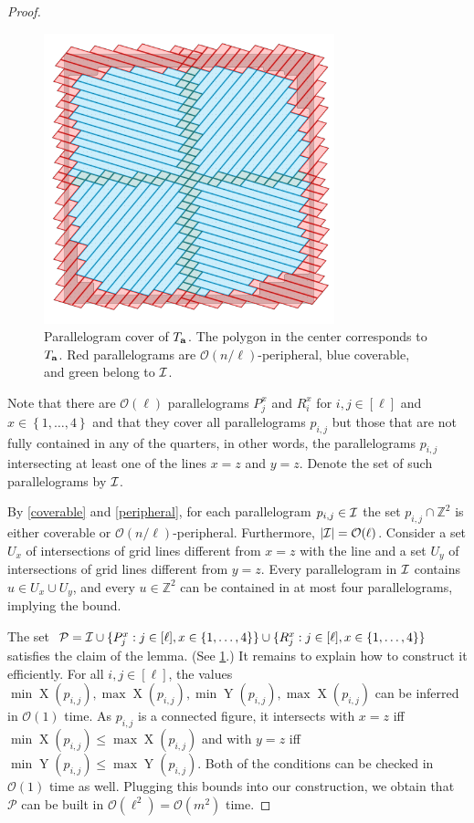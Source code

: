 \documentclass[11pt, letterpaper]{article}
\theoremstyle{plain}
\theoremstyle{definition}
\theoremstyle{remark}
\newcommand{\Z}{\mathbb{Z}}
\renewcommand{\O}{\mathcal{O}}
\newcommand{\set}[1]{\left\lbrace #1 \right\rbrace}
\DeclareMathOperator*{\X}{X}
\DeclareMathOperator*{\Y}{Y}
\newcommand{\absolute}[1]{\left\lvert#1\right\rvert}
\begin{document}
\begin{proof}
\begin{figure}[h!]
        \centering
        \includegraphics[width=0.75\textwidth]{drawings/text_decomposition}
        \caption{Parallelogram cover of $T_\mathbf{a}$. The polygon in the center corresponds to $T_\mathbf{a}$. Red parallelograms are $\O(n/\ell)$-peripheral, blue coverable, and green belong to $\mathcal{I}$.}
        \label{figure:text_decomposition}
\end{figure}

Note that there are $\O(\ell)$ parallelograms $P_j^x$ and $R_i^x$ for $i,j \in [\ell]$ and $x \in \set{1, \dots, 4}$ and that they cover all parallelograms $p_{i,j}$ but those that are not fully contained in any of the quarters, in other words, the parallelograms $p_{i, j}$ intersecting  at least one of the lines $x = z$ and $y = z$. Denote the set of such parallelograms by $\mathcal{I}$. 

By \cref{coverable} and \cref{peripheral}, for each parallelogram $p_{i,j} \in \mathcal{I}$ the set $p_{i,j} \cap \Z^2$ is either coverable or $\O(n/\ell)$-peripheral. Furthermore, $\absolute{\I} = \O(\ell)$. Consider a set $U_x$ of intersections of grid lines different from $x=z$ with the line and a set $U_y$ of intersections of grid lines different from $y=z$. Every parallelogram in $\mathcal{I}$ contains $u \in U_x \cup U_y$, and every $u \in \Z^2$ can be contained in at most four parallelograms, implying the bound. 

The set $\mathcal{P} = \mathcal{I} \cup \{P_j^x : j \in [\ell], x \in \{1, \dots, 4\}\} \cup \{R_j^x : j \in [\ell], x \in \{1, \dots, 4\}\}$ satisfies the claim of the lemma. (See \cref{figure:text_decomposition}.) It remains to explain how to construct it efficiently. For all $i,j \in [\ell]$, the values $\min \X(p_{i,j}), \max \X(p_{i,j}), \min \Y(p_{i,j}), \max \X(p_{i,j})$ can be inferred in $\O(1)$ time. As $p_{i,j}$ is a connected figure, it intersects with $x = z$ iff $\min \X(p_{i,j}) \le \max \X(p_{i,j})$ and with $y = z$ iff $\min \Y(p_{i,j}) \le \max \Y(p_{i,j})$. Both of the conditions can be checked in $\O(1)$ time as well. Plugging this bounds into our construction, we obtain that $\mathcal{P}$ can be built in $\O(\ell^2) = \O(m^2)$ time. 
\end{proof}
\end{document}
